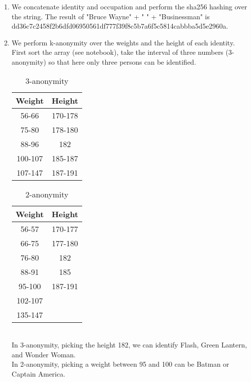 \documentclass[a4paper, 12pt]{article}
\begin{document}
\begin{exercise}
\begin{enumerate}
    \item We concatenate identity and occupation and perform the sha256 hashing over the
string. The result of "Bruce Wayne" + " " + "Businessman" is
dd36c7c2458f2b6dfd06950561df777f39f8c5b7a6f5c5814cabbba5d5e2960a.
	\item We perform k-anonymity over the weights and the height of each
		identity. First sort the array (see notebook), take the interval of
		three numbers (3-anonymity) so that here only three persons can be
		identified. 
		\begin{table}[htpb]
		    \centering
		    \caption{3-anonymity}
		    \label{tab:label}
		    \begin{tabular}{|c | c|}
				\hline
				Weight & Height\\
				\hline
				56-66 & 170-178\\
				75-80 & 178-180\\
				88-96 & 182\\
				100-107 & 185-187\\
				107-147 & 187-191\\
				\hline
		    \end{tabular}
		\end{table}
		\begin{table}[htpb]
		    \centering
		    \caption{2-anonymity}
		    \label{tab:label}
		    \begin{tabular}{|c | c|}
			\hline
		     Weight & Height\\
			 \hline
			 56-57 & 170-177\\
			 66-75 & 177-180\\
			 76-80 & 182\\
			 88-91 & 185\\
			 95-100 & 187-191\\
			 102-107 &  \\
			 135-147& \\
			 \hline

		    \end{tabular}
		\end{table}\\
		In 3-anonymity, picking the height 182, we can identify Flash, Green Lantern, and Wonder
		Woman.\\
		In 2-anonymity, picking a weight between 95 and 100 can be Batman or
		Captain America. 

\end{enumerate}
    
\end{exercise}
\end{document}
